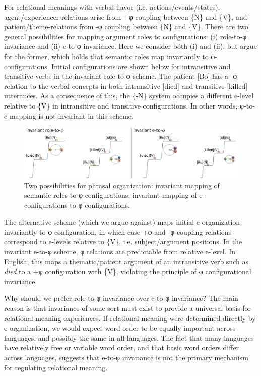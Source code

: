 For relational meanings with verbal flavor (i.e. actions/events/states), agent/experiencer-relations arise from +φ coupling between \{N\} and \{V\}, and patient/theme-relations from -φ coupling between \{N\} and \{V\}. There are two general possibilities for mapping argument roles to configurations: (i) role-to-φ invariance and (ii) e-to-φ invariance. Here we consider both (i) and (ii), but argue for the former, which holds that semantic roles map invariantly to φ-configurations. Initial configurations are shown below for intransitive and transitive verbs in the invariant role-to-φ scheme. The patient [Bo] has a -φ relation to the verbal concepts in both intransitive [died] and transitive [killed] utterances. As a consequence of this, the \{-N\} system occupies a different e-level relative to \{V\} in intransitive and transitive configurations. In other words, φ-to-e mapping is not invariant in this scheme.

  
\begin{figure}
\includegraphics[width=\textwidth]{figures/Tilsen-img71.png}
\caption{Two possibilities for phrasal organization: invariant mapping of semantic roles to φ configurations; invariant mapping of e-configurations to φ configurations.}
\label{fig:4:21}
\end{figure}
 

  The alternative scheme (which we argue against) maps initial e-organization invariantly to φ configuration, in which case +φ and -φ coupling relations correspond to e-levels relative to \{V\}, i.e. subject/argument positions. In the invariant e-to-φ scheme, φ relations are predictable from relative e-level. In English, this maps a thematic/patient argument of an intransitive verb such as \textit{died} to a +φ configuration with \{V\}, violating the principle of φ configurational invariance.

  Why should we prefer role-to-φ invariance over e-to-φ invariance? The main reason is that invariance of some sort must exist to provide a universal basis for relational meaning experiences. If relational meaning were determined directly by e-organization, we would expect word order to be equally important across languages, and possibly the same in all languages. The fact that many languages have relatively free or variable word order, and that basic word orders differ across languages, suggests that e-to-φ invariance is not the primary mechanism for regulating relational meaning. 

